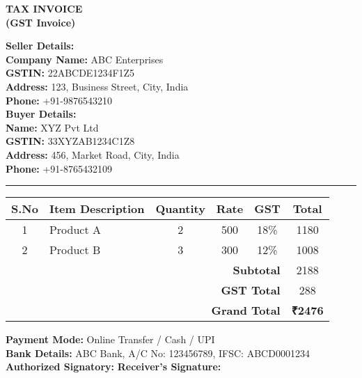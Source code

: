 \documentclass[a4paper,12pt]{article}
\begin{document}
\begin{center}
    {\LARGE \textbf{TAX INVOICE}} \\[5pt]
    \textbf{(GST Invoice)} \\[10pt]
    \hrulefill
\end{center}

\begin{flushleft}
\textbf{Seller Details:} \\
\textbf{Company Name:} ABC Enterprises  \\
\textbf{GSTIN:} 22ABCDE1234F1Z5  \\
\textbf{Address:} 123, Business Street, City, India \\
\textbf{Phone:} +91-9876543210  \\[5pt]

\textbf{Buyer Details:} \\
\textbf{Name:} XYZ Pvt Ltd  \\
\textbf{GSTIN:} 33XYZAB1234C1Z8  \\
\textbf{Address:} 456, Market Road, City, India \\
\textbf{Phone:} +91-8765432109  \\
\end{flushleft}

\hrule
\vspace{10pt}

\begin{tabular}{|c|l|c|c|c|c|}
    \hline
    \textbf{S.No} & \textbf{Item Description} & \textbf{Quantity} & \textbf{Rate} & \textbf{GST} & \textbf{Total} \\
    \hline
    1 & Product A & 2 & 500 & 18\% & 1180 \\
    2 & Product B & 3 & 300 & 12\% & 1008 \\
    \hline
    \multicolumn{5}{|r|}{\textbf{Subtotal}} & 2188 \\
    \multicolumn{5}{|r|}{\textbf{GST Total}} & 288 \\
    \multicolumn{5}{|r|}{\textbf{Grand Total}} & \textbf{₹2476} \\
    \hline
\end{tabular}

\vspace{10pt}
\textbf{Payment Mode:} Online Transfer / Cash / UPI  \\
\textbf{Bank Details:} ABC Bank, A/C No: 123456789, IFSC: ABCD0001234 \\

\vspace{15pt}
\textbf{Authorized Signatory:} \hfill \textbf{Receiver’s Signature:} \\
\hrulefill \hfill \hrulefill
\end{document}
